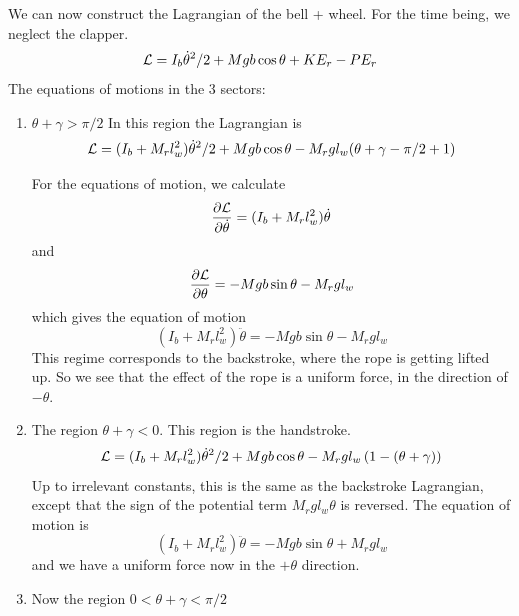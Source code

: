 \documentclass{article}
\begin{document}
We can now construct the Lagrangian of the bell + wheel. For the time being, we neglect the clapper.
\begin{equation}
{\cal L} = I_b \dot{\theta}^2/2 + Mgb \cos \theta + KE_r - PE_r
\end{equation}
The equations of motions in the 3 sectors:
\begin{enumerate}

\item $\theta+\gamma > \pi/2$
In this region the Lagrangian is
\begin{equation}
{\cal L} = (I_b + M_r l_w^2) \dot{\theta}^2/2 + Mgb \cos \theta - M_r g l_w (\theta+\gamma - \pi/2 + 1)
\end{equation}

For the equations of motion, we calculate
\begin{equation}
\frac{\partial \cal L}{\partial \dot{\theta}} = (I_b + M_r l_w^2) \dot\theta
\end{equation}
and
\begin{equation}
\frac{\partial \cal L}{\partial \theta} = -Mgb \sin \theta - M_r g l_w
\end{equation}
which gives the equation of motion
\begin{equation}
(I_b + M_r l_w^2) \ddot{\theta} =  -Mgb \sin \theta - M_r g l_w
\end{equation}
This regime corresponds to the backstroke, where the rope is getting lifted up. So we see that the effect
of the rope is a uniform force, in the direction of $-\theta$.

%

\item The region  $\theta+\gamma < 0$. This region is the handstroke.
\begin{equation}
{\cal L} = (I_b + M_r l_w^2) \dot{\theta}^2/2 + Mgb \cos \theta - M_r g l_w \left(1 - (\theta +\gamma)\right)
\end{equation}
Up to irrelevant constants, this is the same as the backstroke Lagrangian, except that the sign of the
potential term $M_r g l_w \theta$ is reversed. The equation of motion is
\begin{equation}
(I_b + M_r l_w^2) \ddot{\theta} =  -Mgb \sin \theta + M_r g l_w
\end{equation}
and we have a uniform force now in the $+\theta$ direction.

%

\item Now the region $0 < \theta+\gamma < \pi/2$


\end{enumerate}
\end{document}
